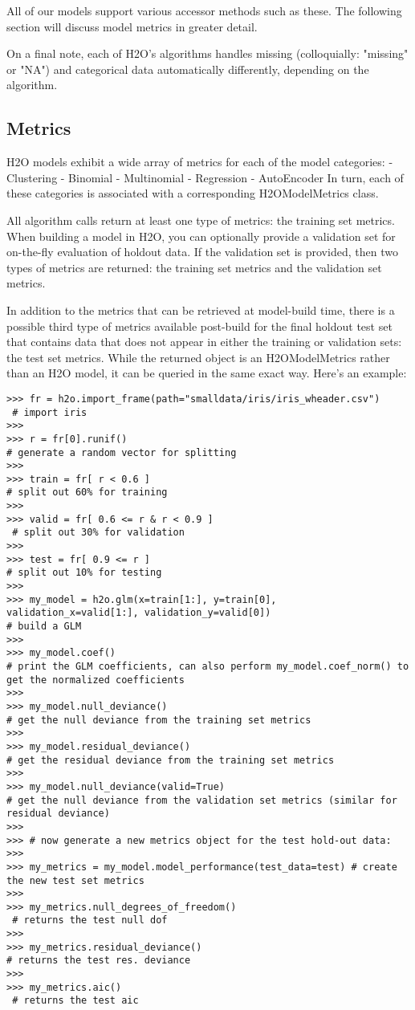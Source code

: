 All of our models support various accessor methods such as these. The following section will discuss model metrics in greater detail.

On a final note, each of H2O's algorithms handles missing (colloquially: "missing" or "NA") and categorical data automatically differently, depending on the algorithm. 

\subsection{Metrics}

H2O models exhibit a wide array of metrics for each of the model categories: - Clustering - Binomial - Multinomial - Regression - AutoEncoder In turn, each of these categories is associated with a corresponding H2OModelMetrics class.

All algorithm calls return at least one type of metrics: the training set metrics. When building a model in H2O, you can optionally provide a validation set for on-the-fly evaluation of holdout data. If the validation set is provided, then two types of metrics are returned: the training set metrics and the validation set metrics.

In addition to the metrics that can be retrieved at model-build time, there is a possible third type of metrics available post-build for the final holdout test set that contains data that does not appear in either the training or validation sets: the test set metrics. While the returned object is an H2OModelMetrics rather than an H2O model, it can be queried in the same exact way. Here's an example:
\begin{lstlisting}[style=python]
>>> fr = h2o.import_frame(path="smalldata/iris/iris_wheader.csv")  
 # import iris
>>>
>>> r = fr[0].runif()                       
# generate a random vector for splitting
>>>
>>> train = fr[ r < 0.6 ]                   
# split out 60% for training
>>>
>>> valid = fr[ 0.6 <= r & r < 0.9 ]       
 # split out 30% for validation
>>>
>>> test = fr[ 0.9 <= r ]                   
# split out 10% for testing
>>>
>>> my_model = h2o.glm(x=train[1:], y=train[0], validation_x=valid[1:], validation_y=valid[0])  
# build a GLM
>>>
>>> my_model.coef()                         
# print the GLM coefficients, can also perform my_model.coef_norm() to get the normalized coefficients
>>>
>>> my_model.null_deviance()                
# get the null deviance from the training set metrics
>>>
>>> my_model.residual_deviance()            
# get the residual deviance from the training set metrics
>>>
>>> my_model.null_deviance(valid=True)      
# get the null deviance from the validation set metrics (similar for residual deviance)
>>>
>>> # now generate a new metrics object for the test hold-out data:
>>>
>>> my_metrics = my_model.model_performance(test_data=test) # create the new test set metrics
>>>
>>> my_metrics.null_degrees_of_freedom()   
 # returns the test null dof
>>>
>>> my_metrics.residual_deviance()          
# returns the test res. deviance
>>>
>>> my_metrics.aic()                       
 # returns the test aic
\end{lstlisting}

